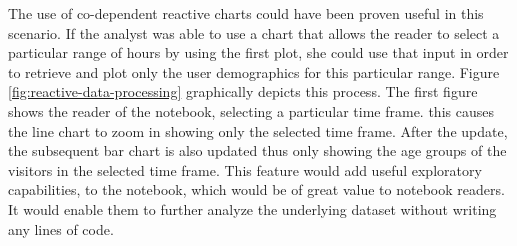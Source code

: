  The use of co-dependent reactive charts could have been proven useful in this scenario. If the analyst was able to use a chart that allows the reader to select a particular range of hours by using the first plot, she could use that input in order to retrieve and plot only the user demographics for this particular range. Figure \ref{fig:reactive-data-processing} graphically depicts this process. The first figure shows the reader of the notebook, selecting a particular time frame. this causes the line chart to zoom in showing only the selected time frame. After the update, the subsequent bar chart is also updated thus only showing the age groups of the visitors in the selected time frame. This feature would add useful exploratory capabilities, to the notebook, which would be of great value to notebook readers. It would enable them to further analyze the underlying dataset without writing any lines of code. 

